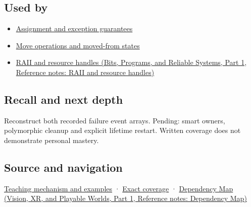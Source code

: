 \subsection{Used by}\label{appendix-9bfe377cef7a-used-by}

\hypertarget{appendix-9bfe377cef7a-used-by}{}

\begin{itemize}
\tightlist
\item
  \hyperref[appendix-bea6beb5350f]{Assignment and exception guarantees}
\item
  \hyperref[appendix-5636651017c2]{Move operations and moved-from states}
\item
  \href{../01-Bits-Programs-and-Reliable-Systems-P01/main.pdf\#nameddest=appendix-69739d3ab49b}{RAII and resource handles (Bits, Programs, and Reliable Systems, Part 1, Reference notes: RAII and resource handles)}
\end{itemize}

\subsection{Recall and next depth}\label{appendix-9bfe377cef7a-recall-and-next-depth}

\hypertarget{appendix-9bfe377cef7a-recall-and-next-depth}{}

Reconstruct both recorded failure event arrays. Pending: smart owners, polymorphic cleanup and explicit lifetime restart. Written coverage does not demonstrate personal mastery.

\subsection{Source and navigation}\label{appendix-9bfe377cef7a-source-and-navigation}

\hypertarget{appendix-9bfe377cef7a-source-and-navigation}{}

\hyperref[01-foundations-i-ch003-destruction-closes-the-ownership-interval]{Teaching mechanism and examples} · \hyperref[appendix-fd090d982a15-m009---parts-127-147]{Exact coverage} · \href{../07-Vision-XR-and-Playable-Worlds-P01/main.pdf\#nameddest=appendix-4ad47bdd269a}{Dependency Map (Vision, XR, and Playable Worlds, Part 1, Reference notes: Dependency Map)}
